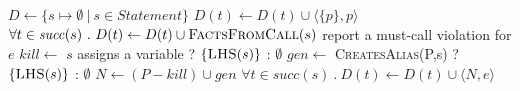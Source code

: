 \begin{algorithm}[t]
  \caption{Finding unfulfilled \<@MustCall> obligations.
  }
  \label{alg:consistency-checker}
  \begin{algorithmic}[1]
  \State $D \gets \{ s \mapsto \emptyset\ |\ s \in \mathit{Statement} \}$\label{li:start-init}
  \label{li:init-formals}
      \State $D(t) \gets D(t) \cup \langle \{p\}, p \rangle$
    \EndIf
  \EndFor \label{li:end-init-formals}
   \label{li:init-calls}
    \State $\forall t \in \mathit{succ}(s)\ .\ D(t) \leftarrow D(t) \cup \textsc{FactsFromCall}(s)$
  \EndFor  \label{li:end-init}
     \label{li:end-scope}
      \State report a must-call violation for $e$
     \label{li:check-satisfied}
    \State $kill \gets $ $s$ assigns a variable ? $\{\textsc{LHS}(s)\}$ : $\emptyset$ \label{li:compute-kill}
    \State $gen \gets$ \textsc{CreatesAlias}(P,s) ? $\{\textsc{LHS}(s)\}$ : $\emptyset$ \label{li:compute-gen} 
    \State $N \gets (P - kill) \cup gen$ \label{li:compute-new-mc-aliases}
    \State $\forall t \in \mathit{succ}(s)\ .\ D(t) \leftarrow D(t) \cup \langle
    N, e \rangle$ \label{li:prop-to-succs}
    \EndIf
    \EndFor
  \EndWhile \label{li:alg-loop-end}
  \EndProcedure
  \end{algorithmic}
\end{algorithm}

